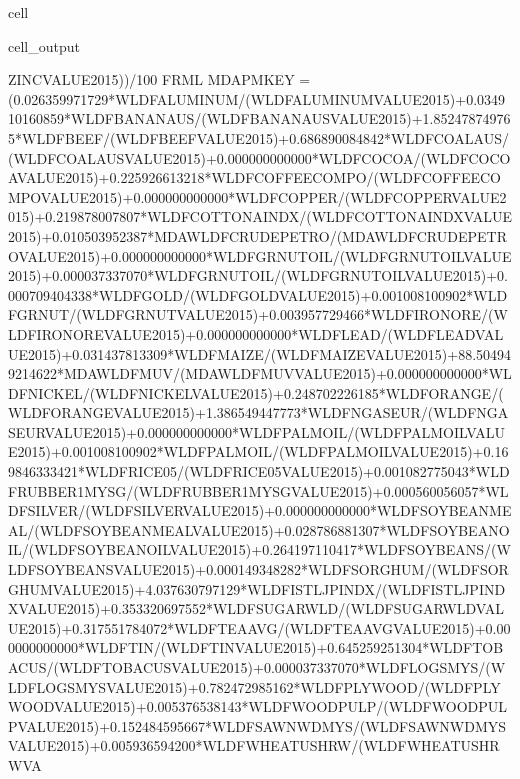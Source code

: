 \documentclass[letterpaper,10pt,english]{jupyterBook}
\begin{document}
\begin{sphinxuseclass}{cell}
\begin{sphinxVerbatimOutput}
\begin{sphinxuseclass}{cell_output}
\begin{sphinxVerbatim}[commandchars=\\\{\}]
ZINC\PYGZus{}VALUE\PYGZus{}2015))/100 \PYGZdl{}
FRML  \PYGZlt{}\PYGZgt{} MDAPMKEY = (0.026359971729*WLDFALUMINUM/(WLDFALUMINUM\PYGZus{}VALUE\PYGZus{}2015)+0.034910160859*WLDFBANANA\PYGZus{}US/(WLDFBANANA\PYGZus{}US\PYGZus{}VALUE\PYGZus{}2015)+1.852478749765*WLDFBEEF/(WLDFBEEF\PYGZus{}VALUE\PYGZus{}2015)+0.686890084842*WLDFCOAL\PYGZus{}AUS/(WLDFCOAL\PYGZus{}AUS\PYGZus{}VALUE\PYGZus{}2015)+0.000000000000*WLDFCOCOA/(WLDFCOCOA\PYGZus{}VALUE\PYGZus{}2015)+0.225926613218*WLDFCOFFEE\PYGZus{}COMPO/(WLDFCOFFEE\PYGZus{}COMPO\PYGZus{}VALUE\PYGZus{}2015)+0.000000000000*WLDFCOPPER/(WLDFCOPPER\PYGZus{}VALUE\PYGZus{}2015)+0.219878007807*WLDFCOTTON\PYGZus{}A\PYGZus{}INDX/(WLDFCOTTON\PYGZus{}A\PYGZus{}INDX\PYGZus{}VALUE\PYGZus{}2015)+0.010503952387*MDAWLDFCRUDE\PYGZus{}PETRO/(MDAWLDFCRUDE\PYGZus{}PETRO\PYGZus{}VALUE\PYGZus{}2015)+0.000000000000*WLDFGRNUT\PYGZus{}OIL/(WLDFGRNUT\PYGZus{}OIL\PYGZus{}VALUE\PYGZus{}2015)+0.000037337070*WLDFGRNUT\PYGZus{}OIL/(WLDFGRNUT\PYGZus{}OIL\PYGZus{}VALUE\PYGZus{}2015)+0.000709404338*WLDFGOLD/(WLDFGOLD\PYGZus{}VALUE\PYGZus{}2015)+0.001008100902*WLDFGRNUT/(WLDFGRNUT\PYGZus{}VALUE\PYGZus{}2015)+0.003957729466*WLDFIRON\PYGZus{}ORE/(WLDFIRON\PYGZus{}ORE\PYGZus{}VALUE\PYGZus{}2015)+0.000000000000*WLDFLEAD/(WLDFLEAD\PYGZus{}VALUE\PYGZus{}2015)+0.031437813309*WLDFMAIZE/(WLDFMAIZE\PYGZus{}VALUE\PYGZus{}2015)+88.504949214622*MDAWLDFMUV/(MDAWLDFMUV\PYGZus{}VALUE\PYGZus{}2015)+0.000000000000*WLDFNICKEL/(WLDFNICKEL\PYGZus{}VALUE\PYGZus{}2015)+0.248702226185*WLDFORANGE/(WLDFORANGE\PYGZus{}VALUE\PYGZus{}2015)+1.386549447773*WLDFNGAS\PYGZus{}EUR/(WLDFNGAS\PYGZus{}EUR\PYGZus{}VALUE\PYGZus{}2015)+0.000000000000*WLDFPALM\PYGZus{}OIL/(WLDFPALM\PYGZus{}OIL\PYGZus{}VALUE\PYGZus{}2015)+0.001008100902*WLDFPALM\PYGZus{}OIL/(WLDFPALM\PYGZus{}OIL\PYGZus{}VALUE\PYGZus{}2015)+0.169846333421*WLDFRICE\PYGZus{}05/(WLDFRICE\PYGZus{}05\PYGZus{}VALUE\PYGZus{}2015)+0.001082775043*WLDFRUBBER1\PYGZus{}MYSG/(WLDFRUBBER1\PYGZus{}MYSG\PYGZus{}VALUE\PYGZus{}2015)+0.000560056057*WLDFSILVER/(WLDFSILVER\PYGZus{}VALUE\PYGZus{}2015)+0.000000000000*WLDFSOYBEAN\PYGZus{}MEAL/(WLDFSOYBEAN\PYGZus{}MEAL\PYGZus{}VALUE\PYGZus{}2015)+0.028786881307*WLDFSOYBEAN\PYGZus{}OIL/(WLDFSOYBEAN\PYGZus{}OIL\PYGZus{}VALUE\PYGZus{}2015)+0.264197110417*WLDFSOYBEANS/(WLDFSOYBEANS\PYGZus{}VALUE\PYGZus{}2015)+0.000149348282*WLDFSORGHUM/(WLDFSORGHUM\PYGZus{}VALUE\PYGZus{}2015)+4.037630797129*WLDFISTL\PYGZus{}JP\PYGZus{}INDX/(WLDFISTL\PYGZus{}JP\PYGZus{}INDX\PYGZus{}VALUE\PYGZus{}2015)+0.353320697552*WLDFSUGAR\PYGZus{}WLD/(WLDFSUGAR\PYGZus{}WLD\PYGZus{}VALUE\PYGZus{}2015)+0.317551784072*WLDFTEA\PYGZus{}AVG/(WLDFTEA\PYGZus{}AVG\PYGZus{}VALUE\PYGZus{}2015)+0.000000000000*WLDFTIN/(WLDFTIN\PYGZus{}VALUE\PYGZus{}2015)+0.645259251304*WLDFTOBAC\PYGZus{}US/(WLDFTOBAC\PYGZus{}US\PYGZus{}VALUE\PYGZus{}2015)+0.000037337070*WLDFLOGS\PYGZus{}MYS/(WLDFLOGS\PYGZus{}MYS\PYGZus{}VALUE\PYGZus{}2015)+0.782472985162*WLDFPLYWOOD/(WLDFPLYWOOD\PYGZus{}VALUE\PYGZus{}2015)+0.005376538143*WLDFWOODPULP/(WLDFWOODPULP\PYGZus{}VALUE\PYGZus{}2015)+0.152484595667*WLDFSAWNWD\PYGZus{}MYS/(WLDFSAWNWD\PYGZus{}MYS\PYGZus{}VALUE\PYGZus{}2015)+0.005936594200*WLDFWHEAT\PYGZus{}US\PYGZus{}HRW/(WLDFWHEAT\PYGZus{}US\PYGZus{}HRW\PYGZus{}VA
\end{sphinxVerbatim}
\end{sphinxuseclass}
\end{sphinxVerbatimOutput}
\end{sphinxuseclass}
\end{document}
